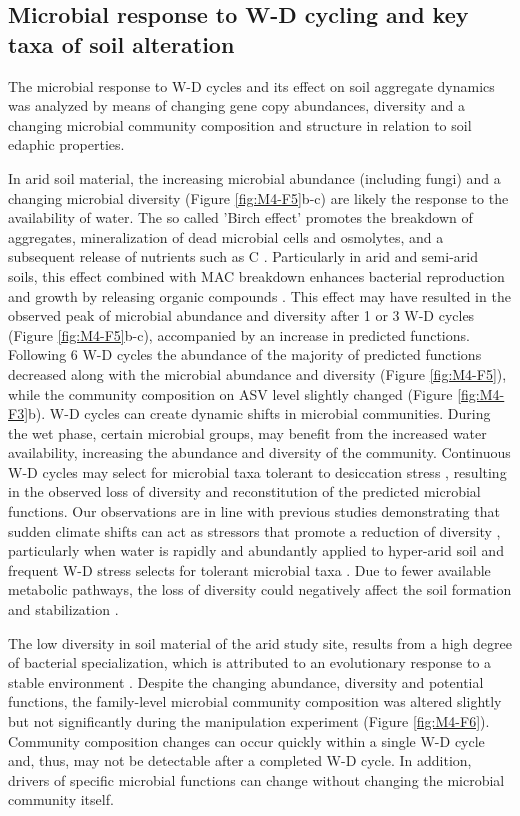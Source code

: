 \subsection{Microbial response to W-D cycling and key taxa of soil alteration}

The microbial response to W-D cycles and its effect on soil aggregate dynamics was analyzed by means of changing gene copy abundances, diversity and a changing microbial community composition and structure in relation to soil edaphic properties.

In arid soil material, the increasing microbial abundance (including fungi) and a changing microbial diversity (Figure \ref{fig:M4-F5}b-c) are likely the response to the availability of water. The so called 'Birch effect' promotes the breakdown of aggregates, mineralization of dead microbial cells and osmolytes, and a subsequent release of nutrients such as C \citep{Jarvis2007}. Particularly in arid and semi-arid soils, this effect combined with MAC breakdown enhances bacterial reproduction and growth by releasing organic compounds \citep{Armstrong2016, Seuss2022}. This effect may have resulted in the observed peak of microbial abundance and diversity after 1 or 3 W-D cycles (Figure \ref{fig:M4-F5}b-c), accompanied by an increase in predicted functions. Following 6 W-D cycles the abundance of the majority of predicted functions decreased along with the microbial abundance and diversity (Figure \ref{fig:M4-F5}), while the community composition on ASV level slightly changed (Figure \ref{fig:M4-F3}b). W-D cycles can create dynamic shifts in microbial communities. During the wet phase, certain microbial groups, may benefit from the increased water availability, increasing the abundance and diversity of the community. Continuous W-D cycles may select for microbial taxa tolerant to desiccation stress \citep{Evans2012}, resulting in the observed loss of diversity and reconstitution of the predicted microbial functions. Our observations are in line with previous studies demonstrating that sudden climate shifts can act as stressors that promote a reduction of diversity \citep{Clavel2011}, particularly when water is rapidly and abundantly applied to hyper-arid soil \citep{AzuaBustos2018} and frequent W-D stress selects for tolerant microbial taxa \citep{Seuss2022}. Due to fewer available metabolic pathways, the loss of diversity could negatively affect the soil formation and stabilization \citep{Bestion2020, Shen2023}.

The low diversity in soil material of the arid study site, results from a high degree of bacterial specialization, which is attributed to an evolutionary response to a stable environment \citep{Rodriguez2022}. Despite the changing abundance, diversity and potential functions, the family-level microbial community composition was altered slightly but not significantly during the manipulation experiment (Figure \ref{fig:M4-F6}). Community composition changes can occur quickly within a single W-D cycle \citep{Evans2012} and, thus, may not be detectable after a completed W-D cycle. In addition, drivers of specific microbial functions can change without changing the microbial community itself.

